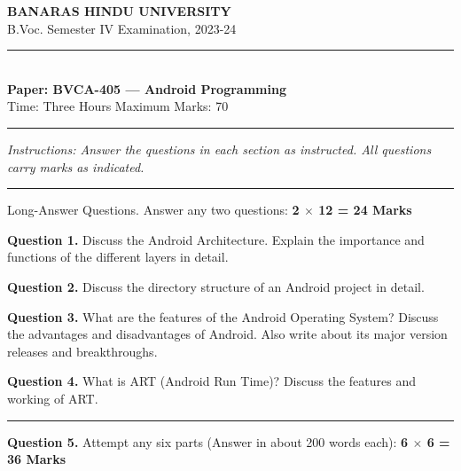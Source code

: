 \documentclass[11pt,a4paper]{article}
\begin{document}
\begin{center}
  {\large\bfseries BANARAS HINDU UNIVERSITY}\\[2pt]
  {\normalsize B.Voc. Semester IV Examination, 2023-24}\\[6pt]
  \rule{0.8\linewidth}{0.5pt}\\[6pt]
  {\large\bfseries Paper: BVCA-405 --- Android Programming}\\[4pt]
  {\normalsize Time: Three Hours \hfill Maximum Marks: 70}
\end{center}

\rule{\linewidth}{0.4pt}

\smallskip



\noindent   \textit{Instructions: Answer the questions in each section as instructed. All questions carry marks as indicated.}

\bigskip




\rule{\linewidth}{0.4pt}\smallskip

Long-Answer Questions. Answer any two questions: \hfill   \textbf{2 $ \times$ 12 = 24 Marks}

\medskip



\noindent   \textbf{Question 1.} Discuss the Android Architecture. Explain the importance and functions of the different layers in detail.

\medskip



\noindent   \textbf{Question 2.} Discuss the directory structure of an Android project in detail.

\medskip



\noindent   \textbf{Question 3.} What are the features of the Android Operating System? Discuss the advantages and disadvantages of Android. Also write about its major version releases and breakthroughs.

\medskip



\noindent   \textbf{Question 4.} What is ART (Android Run Time)? Discuss the features and working of ART.

\bigskip


\rule{\linewidth}{0.4pt}\smallskip




\noindent   \textbf{Question 5.} Attempt any six parts (Answer in about 200 words each): \hfill   \textbf{6 $ \times$ 6 = 36 Marks}
\end{document}
